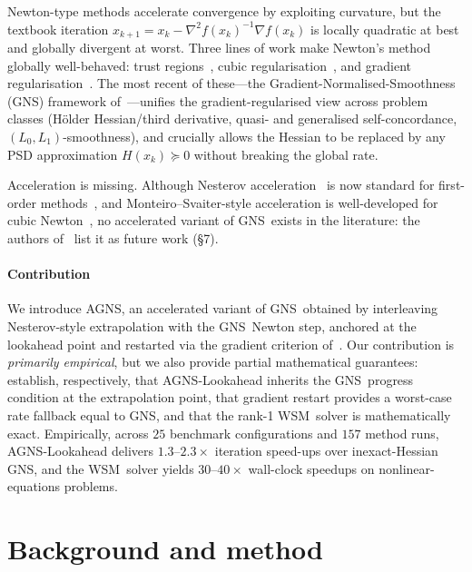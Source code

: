 \documentclass[conference]{IEEEtran}
\theoremstyle{remark}
\newcommand{\AGNS}{\textsc{AGNS}}
\newcommand{\GNS}{\textsc{GNS}}
\newcommand{\WSM}{\textsc{WSM}}
\begin{document}
Newton-type methods accelerate convergence by exploiting curvature,
but the textbook iteration $x_{k+1} = x_k - \nabla^2 f(x_k)^{-1}
\nabla f(x_k)$ is locally quadratic at best and globally divergent
at worst. Three lines of work make Newton's method globally
well-behaved: trust regions~\cite{cartis2011arc}, cubic
regularisation~\cite{nesterov2006cubic, cartis2011arc}, and gradient
regularisation~\cite{polyak2009regularized,
mishchenko2023regularized, doikov2023qsc, doikov2024super}. The most
recent of these---the Gradient-Normalised-Smoothness (\GNS)
framework of~\cite{semenov2025gradient}---unifies the
gradient-regularised view across problem classes (H\"older
Hessian/third derivative, quasi- and generalised self-concordance,
$(L_0,L_1)$-smoothness), and crucially allows the Hessian to be
replaced by any PSD approximation $H(x_k) \succeq 0$ without breaking
the global rate.

Acceleration is missing. Although Nesterov
acceleration~\cite{nesterov1983method} is now standard for
first-order methods~\cite{beck2009fast}, and Monteiro--Svaiter-style
acceleration is well-developed for cubic Newton~\cite{carmon2022optimal},
no accelerated variant of \GNS\ exists in the literature: the authors
of~\cite{semenov2025gradient} list it as future work (\S 7).

\paragraph{Contribution}
We introduce \AGNS, an accelerated variant of \GNS\ obtained by
interleaving Nesterov-style extrapolation with the \GNS\ Newton step,
anchored at the lookahead point and restarted via the gradient
criterion of~\cite{odonoghue2015restart}. Our contribution is
\emph{primarily empirical}, but we also provide partial mathematical
guarantees: 
establish, respectively, that \AGNS-Lookahead inherits the \GNS\
progress condition at the extrapolation point, that gradient restart
provides a worst-case rate fallback equal to \GNS, and that the rank-1
\WSM\ solver is mathematically exact. Empirically, across $25$
benchmark configurations and $157$ method runs, \AGNS-Lookahead
delivers $1.3$--$2.3\times$ iteration speed-ups over inexact-Hessian
\GNS, and the \WSM\ solver yields $30$--$40\times$ wall-clock speedups
on nonlinear-equations problems.

\section{Background and method}
\label{sec:method}
\end{document}
